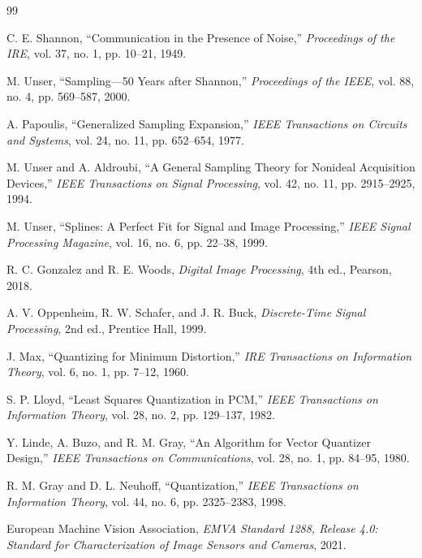 \begin{thebibliography}{99}
\begin{LTR}

C. E. Shannon,
``Communication in the Presence of Noise,''
\emph{Proceedings of the IRE}, vol. 37, no. 1, pp. 10--21, 1949.

M. Unser,
``Sampling---50 Years after Shannon,''
\emph{Proceedings of the IEEE}, vol. 88, no. 4, pp. 569--587, 2000.

A. Papoulis,
``Generalized Sampling Expansion,''
\emph{IEEE Transactions on Circuits and Systems}, vol. 24, no. 11, pp. 652--654, 1977.

M. Unser and A. Aldroubi,
``A General Sampling Theory for Nonideal Acquisition Devices,''
\emph{IEEE Transactions on Signal Processing}, vol. 42, no. 11, pp. 2915--2925, 1994.

M. Unser,
``Splines: A Perfect Fit for Signal and Image Processing,''
\emph{IEEE Signal Processing Magazine}, vol. 16, no. 6, pp. 22--38, 1999.

R. C. Gonzalez and R. E. Woods,
\emph{Digital Image Processing}, 4th ed., Pearson, 2018.

A. V. Oppenheim, R. W. Schafer, and J. R. Buck,
\emph{Discrete-Time Signal Processing}, 2nd ed., Prentice Hall, 1999.

J. Max,
``Quantizing for Minimum Distortion,''
\emph{IRE Transactions on Information Theory}, vol. 6, no. 1, pp. 7--12, 1960.

S. P. Lloyd,
``Least Squares Quantization in PCM,''
\emph{IEEE Transactions on Information Theory}, vol. 28, no. 2, pp. 129--137, 1982.

Y. Linde, A. Buzo, and R. M. Gray,
``An Algorithm for Vector Quantizer Design,''
\emph{IEEE Transactions on Communications}, vol. 28, no. 1, pp. 84--95, 1980.

R. M. Gray and D. L. Neuhoff,
``Quantization,''
\emph{IEEE Transactions on Information Theory}, vol. 44, no. 6, pp. 2325--2383, 1998.

European Machine Vision Association,
\emph{EMVA Standard 1288, Release 4.0: Standard for Characterization of Image Sensors and Cameras}, 2021.


\end{LTR}
\end{thebibliography}
